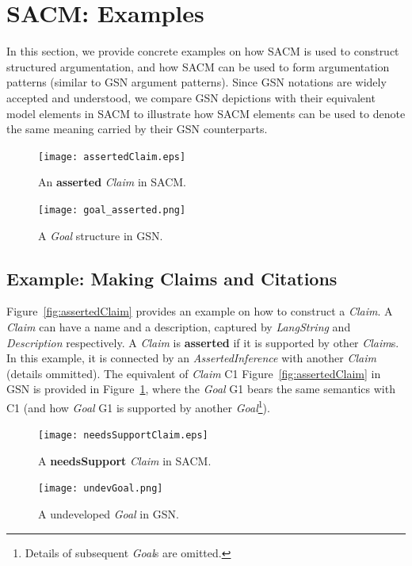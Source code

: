 \section{SACM: Examples}
In this section, we provide concrete examples on how SACM is used to construct structured argumentation, and how SACM can be used to form argumentation patterns (similar to GSN argument patterns). 
Since GSN notations are widely accepted and understood, we compare GSN depictions with their equivalent model elements in SACM to illustrate how SACM elements can be used to denote the same meaning carried by their GSN counterparts.

\begin{figure}
	\centering
	\begin{minipage}[b]{0.7\textwidth}
		\texttt{[image: assertedClaim.eps]}
		\caption{An \textbf{asserted} \textit{Claim} in SACM.}
		\label{fig:assertedClaim}
	\end{minipage}
	\hfill
	\begin{minipage}[b]{0.28\textwidth}
		\texttt{[image: goal\_asserted.png]}
		\caption{A \textit{Goal} structure in GSN.}
		\label{fig:goalingsn}
	\end{minipage}
\end{figure}

\subsection{Example: Making Claims and Citations}
\label{sec:claims}

Figure~\ref{fig:assertedClaim} provides an example on how to construct a \textit{Claim}. 
A \textit{Claim} can have a name and a description, captured by \textit{LangString} and \textit{Description} respectively. 
A \textit{Claim} is \textbf{asserted} if it is supported by other \textit{Claim}s. 
In this example, it is connected by an \textit{AssertedInference} with another \textit{Claim} (details ommitted). 
The equivalent of \textit{Claim} C1 Figure~\ref{fig:assertedClaim} in GSN is provided in Figure~\ref{fig:goalingsn}, where the \textit{Goal} G1 bears the same semantics with C1 (and how \textit{Goal} G1 is supported by another \textit{Goal}\footnote{Details of subsequent \textit{Goal}s are omitted.}).

\begin{figure}
	\centering
	\begin{minipage}[b]{0.7\textwidth}
		\texttt{[image: needsSupportClaim.eps]}
		\caption{A \textbf{needsSupport} \textit{Claim} in SACM.}
		\label{fig:needsSupportClaim}
	\end{minipage}
	\hfill
	\begin{minipage}[b]{0.28\textwidth}
		\texttt{[image: undevGoal.png]}
		\caption{A undeveloped \textit{Goal} in GSN.}
		\label{fig:undevGoal}
	\end{minipage}
\end{figure}

